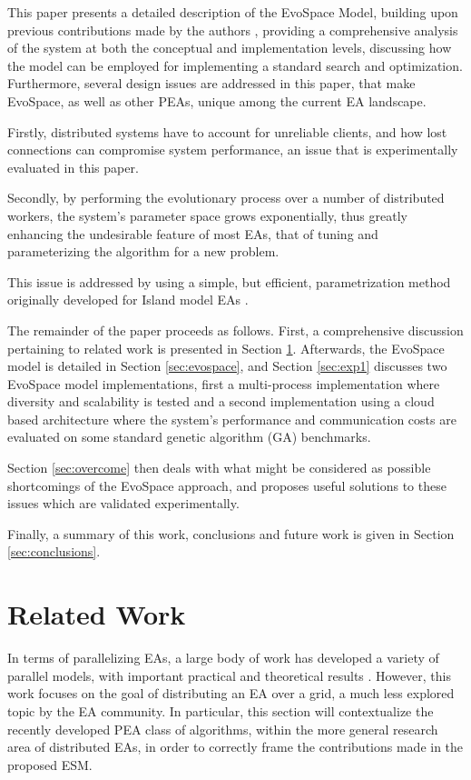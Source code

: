This paper presents a detailed description of the EvoSpace Model, building upon previous contributions made by the authors \cite{Evospace,FreeLunch},
providing a comprehensive analysis of the system at both the
conceptual and implementation levels, %
discussing how the model can be
employed for implementing a standard search and optimization.
Furthermore, several design issues are addressed in this paper, that
make EvoSpace, as well as other PEAs,  %
unique among the current EA landscape.

Firstly, distributed systems have to account for unreliable clients, and how lost connections can compromise system performance,
an issue that is experimentally evaluated in this paper.

Secondly, by performing the evolutionary process over a number of distributed workers, the system's parameter space grows exponentially,
thus greatly enhancing the undesirable feature of most EAs, that of tuning and parameterizing the algorithm for a new problem.

This issue is addressed by using a simple, but efficient,
parametrization method originally developed for Island model EAs
\cite{fuku2}.

The remainder of the paper proceeds as follows.
First, a comprehensive discussion pertaining to related work is presented in Section \ref{sec:related}.
Afterwards, the EvoSpace model is detailed in Section \ref{sec:evospace}, and Section \ref{sec:exp1} discusses two EvoSpace model implementations, first a multi-process implementation where diversity and scalability is tested and a second implementation using a cloud based architecture where the system's performance and communication costs are evaluated on some standard genetic algorithm (GA) benchmarks.

Section \ref{sec:overcome} then deals with what might be considered as possible shortcomings of the EvoSpace approach,
and proposes useful solutions to these issues which are validated experimentally.
 
Finally, a summary of this work, conclusions and future work is given in Section \ref{sec:conclusions}.
 


\section{Related Work}
\label{sec:related}
In terms of parallelizing EAs, a large body of work has developed a variety of parallel models, with
important practical and theoretical results \cite{parallelEA}.
However, this work focuses on the goal of distributing an EA over a grid, a much less explored topic by the EA community.
In particular, this section will contextualize the recently developed PEA class of algorithms, within the more general research area of distributed EAs,
in order to correctly frame the contributions made in the proposed ESM.


